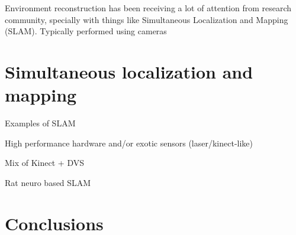 Environment reconstruction has been receiving a lot of attention from research  community, specially with things like Simultaneous Localization and Mapping (SLAM). Typically performed using cameras


\section{Simultaneous localization and mapping}

Examples of SLAM

High performance hardware and/or exotic sensors (laser/kinect-like)

Mix of Kinect + DVS

Rat neuro based SLAM



\section{Conclusions}
